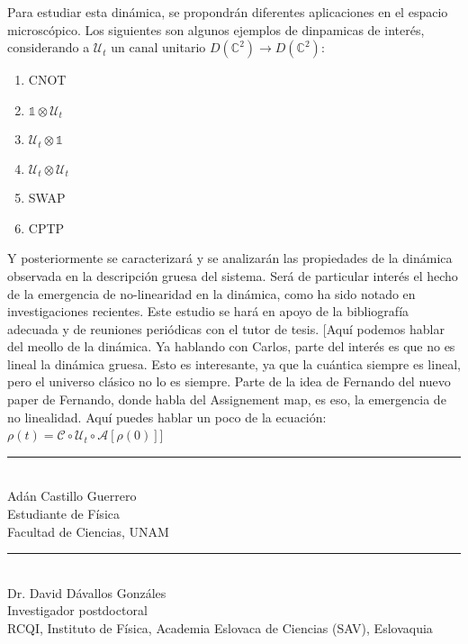 \documentclass[onecolumn,11pt]{article}
\newcommand{\mcU}{\mathcal{U}}
\newcommand{\mcC}{\mathcal{C}}
\newcommand{\mcA}{\mathcal{A}}
\newcommand{\Complex}{\mathbb{C}} %
\newcommand{\Id}{\mathds{1}}%
\newcommand{\nota}[1]{{\color{red} [#1]}}
\begin{document}
Para estudiar esta dinámica, se propondrán diferentes aplicaciones en el espacio microscópico. Los siguientes son algunos ejemplos de dinpamicas de interés, considerando a $\mcU_{t}$ un canal unitario $D(\Complex^{2})\rightarrow D(\Complex^{2})$:
    \begin{multicols}{3}
    \begin{enumerate}
        \item \textsc{CNOT}
        \item $\Id\otimes \mcU_{t}$
        \item $\mcU_{t}\otimes\Id$
        \item $\mcU_{t}\otimes \mcU_{t}$
        \item \textsc{SWAP}
        \item \textsc{CPTP}
    \end{enumerate}
    \end{multicols}
Y posteriormente se caracterizará y se analizarán las propiedades de la dinámica observada en la descripción gruesa del sistema. Será de particular interés el hecho de la emergencia de no-linearidad en la dinámica, como ha sido notado en investigaciones recientes\cite{Macro-To-Micro}\cite{CGEmergingDynamics}. Este estudio se hará en apoyo de la bibliografía adecuada y de reuniones periódicas con el tutor de tesis.
\nota{Aquí podemos hablar del meollo de la dinámica. Ya hablando con Carlos, parte del interés es que no es lineal la dinámica gruesa. Esto es interesante, ya que la cuántica siempre es lineal, pero el universo clásico no lo es siempre. Parte de la idea de Fernando del nuevo paper de Fernando, donde habla del Assignement map, es eso, la emergencia de no linealidad. Aquí puedes hablar un poco de la ecuación: $\rho(t)=\mcC \circ \mcU_t \circ \mcA [\rho(0)]$}


\begin{center}
    \rule{200pt}{0.4pt}\\
    Adán Castillo Guerrero \\
    Estudiante de Física \\
    Facultad de Ciencias, UNAM \\
    
\end{center}

\vspace{1.0cm}

\begin{center}
    \rule{200pt}{0.4pt}\\
    Dr. David Dávallos Gonzáles \\
    Investigador postdoctoral \\
    RCQI, Instituto de Física, Academia Eslovaca de Ciencias (SAV), Eslovaquia\\
    
\end{center}


\end{document}
